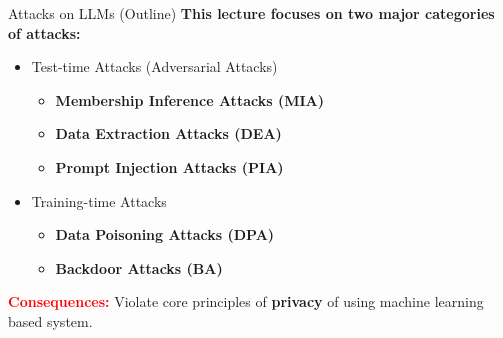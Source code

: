 \documentclass[12pt,aspectratio=169,handout]{beamer}
\begin{document}
%
%




%




\begin{frame}{Attacks on LLMs (Outline)}
\textbf{This lecture focuses on two major categories of attacks:}

\begin{itemize}
 \item Test-time Attacks (Adversarial Attacks)
 \begin{itemize}
    \item \textbf{Membership Inference Attacks (MIA)}
    \item \textbf{Data Extraction Attacks (DEA)}
    \item \textbf{Prompt Injection Attacks (PIA)}
  \end{itemize}
 \item Training-time Attacks
 \begin{itemize}
    \item \textbf{Data Poisoning Attacks (DPA)}
    \item \textbf{Backdoor Attacks (BA)}
  \end{itemize}
\end{itemize}
\textcolor{red}{\textbf{Consequences: }} Violate core principles of \textbf{privacy} of using machine learning based system.
\end{frame}
\end{document}
